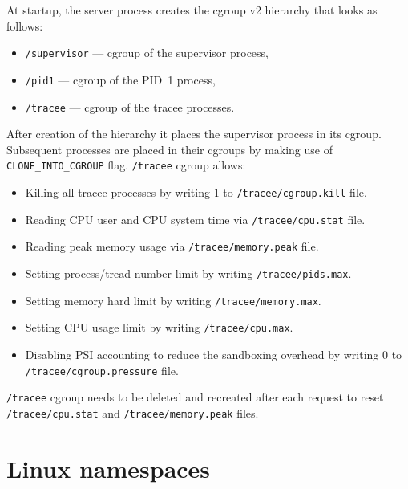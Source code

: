 \documentclass[en]{pracamgr}
\begin{document}
At startup, the server process creates the cgroup v2 hierarchy that looks as follows:
\begin{itemize}
    \item \texttt{/supervisor} --- cgroup of the supervisor process,
    \item \texttt{/pid1} --- cgroup of the PID~1 process,
    \item \texttt{/tracee} --- cgroup of the tracee processes.
\end{itemize}
After creation of the hierarchy it places the supervisor process in its cgroup. Subsequent processes are placed in their cgroups by making use of \texttt{CLONE\_INTO\_CGROUP} flag.
\newline
\texttt{/tracee} cgroup allows:
\begin{itemize}
    \item Killing all tracee processes by writing 1 to \texttt{/tracee/cgroup.kill} file.
    \item Reading CPU user and CPU system time via \texttt{/tracee/cpu.stat} file.
    \item Reading peak memory usage via \texttt{/tracee/memory.peak} file.
    \item Setting process/tread number limit by writing \texttt{/tracee/pids.max}.
    \item Setting memory hard limit by writing \texttt{/tracee/memory.max}.
    \item Setting CPU usage limit by writing \texttt{/tracee/cpu.max}.
    \item Disabling PSI accounting to reduce the sandboxing overhead by writing 0 to \\\texttt{/tracee/cgroup.pressure} file.
\end{itemize}
\texttt{/tracee} cgroup needs to be deleted and recreated after each request to reset \texttt{/tracee/cpu.stat} and \texttt{/tracee/memory.peak} files.

\section{Linux namespaces}
\end{document}
